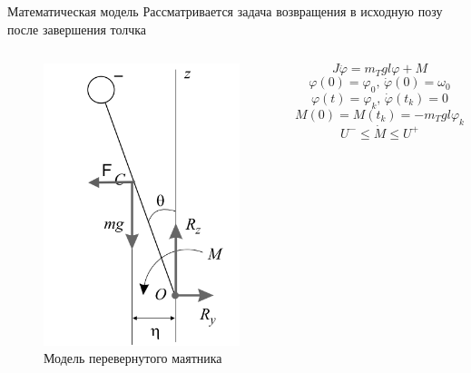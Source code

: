 \documentclass[10pt]{beamer}
\begin{document}
\begin{frame}{Математическая модель}
	Рассматривается задача возвращения в исходную позу после завершения толчка
	\begin{columns}
		\begin{figure}[h!]
			\includegraphics[width=0.6\linewidth]{images/body_1.png}
			\caption{Модель перевернутого маятника}
		\end{figure}

		\[
			J\ddot{\varphi}=m_Tgl\varphi+M
		\]
		\[
			\varphi(0)=\varphi_0,\, \dot{\varphi}(0)=\omega_0
		\]
		\[
			\varphi(t)=\varphi_k,\, \dot{\varphi}(t_k)=0
		\]
		\[
			M(0)=M(t_k)=-m_Tgl\varphi_k
		\]
		\[
			U^-\leq\dot{M}\leq U^+
		\]
	\end{columns}
\end{frame}
\end{document}
